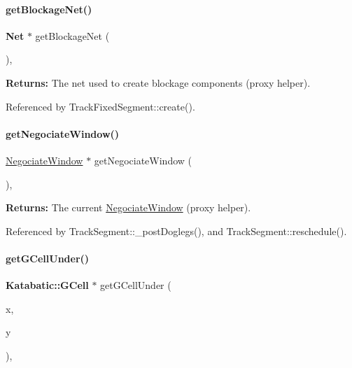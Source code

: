 \paragraph{\texorpdfstring{get\+Blockage\+Net()}{getBlockageNet()}}
{\footnotesize\ttfamily \textbf{ Net} $\ast$ get\+Blockage\+Net (\begin{DoxyParamCaption}{ }\end{DoxyParamCaption})\hspace{0.3cm}{\ttfamily [inline]}, {\ttfamily [static]}}

{\bfseries Returns\+:} The net used to create blockage components (proxy helper). 

Referenced by Track\+Fixed\+Segment\+::create().

\mbox{\label{classKite_1_1Session_a39ebff178f2e0abb9d5a29f485e0bbab}} 
\paragraph{\texorpdfstring{get\+Negociate\+Window()}{getNegociateWindow()}}
{\footnotesize\ttfamily \mbox{\hyperlink{classKite_1_1NegociateWindow}{Negociate\+Window}} $\ast$ get\+Negociate\+Window (\begin{DoxyParamCaption}{ }\end{DoxyParamCaption})\hspace{0.3cm}{\ttfamily [inline]}, {\ttfamily [static]}}

{\bfseries Returns\+:} The current \mbox{\hyperlink{classKite_1_1NegociateWindow}{Negociate\+Window}} (proxy helper). 

Referenced by Track\+Segment\+::\+\_\+post\+Doglegs(), and Track\+Segment\+::reschedule().

\mbox{\label{classKite_1_1Session_a27ecb1cf5ffabe1c7901c5c894a5067d}} 
\paragraph{\texorpdfstring{get\+G\+Cell\+Under()}{getGCellUnder()}}
{\footnotesize\ttfamily \textbf{ Katabatic\+::\+G\+Cell} $\ast$ get\+G\+Cell\+Under (\begin{DoxyParamCaption}\item[{\textbf{ Db\+U\+::\+Unit}}]{x,  }\item[{\textbf{ Db\+U\+::\+Unit}}]{y }\end{DoxyParamCaption})\hspace{0.3cm}{\ttfamily [inline]}, {\ttfamily [static]}}

